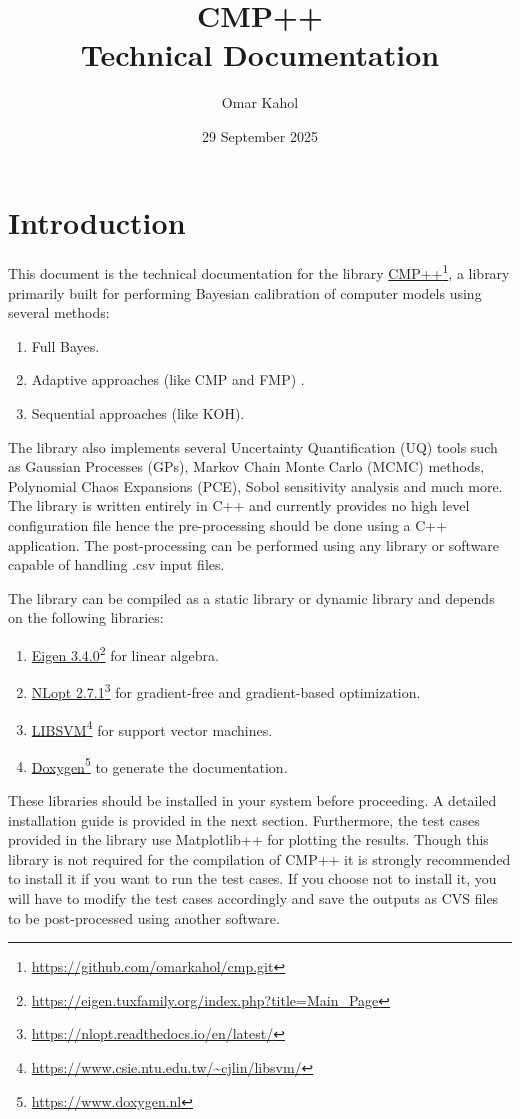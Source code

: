 \documentclass{ol-softwaremanual}
\date{29 September 2025}
\title{CMP++ \\ Technical Documentation}
\author{Omar Kahol}
\newcommand{\doclink}[2]{\href{#1}{#2}\footnote{\url{#1}}}
\begin{document}
\maketitle

\tableofcontents
\listoflistings
\newpage

\section{Introduction}

This document is the technical documentation for the library \doclink{https://github.com/omarkahol/cmp.git}{CMP++}, a library primarily built for performing Bayesian calibration of computer models using several methods: 

\begin{enumerate}
    \item Full Bayes.
    \item Adaptive approaches (like CMP and FMP) .
    \item Sequential approaches (like KOH).
\end{enumerate}

The library also implements several Uncertainty Quantification (UQ) tools such as Gaussian Processes (GPs), Markov Chain Monte Carlo (MCMC) methods, Polynomial Chaos Expansions (PCE), Sobol sensitivity analysis and much more. The library is written entirely in C++ and currently provides no high level configuration file hence the pre-processing should be done using a C++ application.
The post-processing can be performed using any library or software capable of handling .csv input files. 

\smallskip
The library can be compiled as a static library or dynamic library and depends on the following libraries:

\begin{enumerate}
    \item \doclink{https://eigen.tuxfamily.org/index.php?title=Main_Page}{Eigen 3.4.0} for linear algebra.
    \item \doclink{https://nlopt.readthedocs.io/en/latest/}{NLopt 2.7.1} for gradient-free and gradient-based optimization.
    \item \doclink{https://www.csie.ntu.edu.tw/~cjlin/libsvm/}{LIBSVM} for support vector machines.
    \item \doclink{https://www.doxygen.nl}{Doxygen} to generate the documentation.
\end{enumerate}

These libraries should be installed in your system before proceeding. A detailed installation guide is provided in the next section. 
Furthermore, the test cases provided in the library use Matplotlib++ for plotting the results. Though this library is not required for the compilation of CMP++ it is strongly recommended to install it if you want to run the test cases. If you choose not to install it, you will have to modify the test cases accordingly and save the outputs as CVS files to be post-processed using another software.
\end{document}
